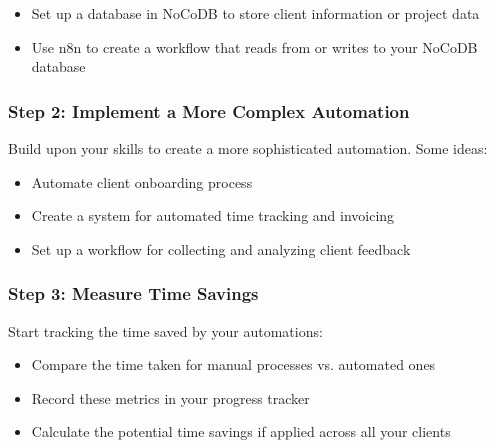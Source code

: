 \begin{itemize}
    \item Set up a database in NoCoDB to store client information or project data
    \item Use n8n to create a workflow that reads from or writes to your NoCoDB database
\end{itemize}


\subsubsection{Step 2: Implement a More Complex Automation}
Build upon your skills to create a more sophisticated automation. Some ideas:

\begin{itemize}
    \item Automate client onboarding process
    \item Create a system for automated time tracking and invoicing
    \item Set up a workflow for collecting and analyzing client feedback
\end{itemize}

\subsubsection{Step 3: Measure Time Savings}
Start tracking the time saved by your automations:

\begin{itemize}
    \item Compare the time taken for manual processes vs. automated ones
    \item Record these metrics in your progress tracker
    \item Calculate the potential time savings if applied across all your clients
\end{itemize}

